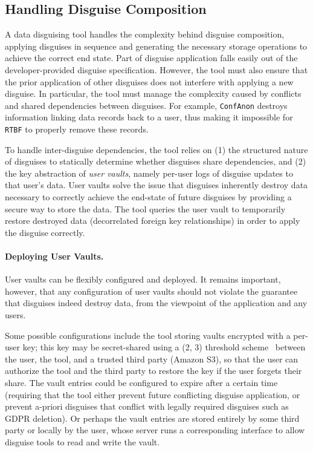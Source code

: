 \subsection{Handling Disguise Composition}
\label{sec:composition}
A data disguising tool handles the complexity behind disguise composition, applying disguises in
sequence and generating the necessary storage operations to achieve the correct end state. 
%
Part of disguise application falls easily out of the developer-provided disguise
specification. However, the tool must also ensure that the prior application of other disguises does
not interfere with applying a new disguise. In particular, the tool must manage the complexity
caused by conflicts and shared dependencies between disguises. 
For example, \texttt{ConfAnon} destroys information linking data records back to a
user, thus making it impossible for \texttt{RTBF} to properly remove these records. 

To handle inter-disguise dependencies, the tool relies on (1) the structured nature of disguises to
statically determine whether disguises share dependencies, and (2) the key abstraction of \emph{user
vaults}, namely per-user logs of disguise updates to that user's data.  User vaults solve the issue
that disguises inherently destroy data necessary to correctly achieve the end-state of future
disguises by providing a secure way to store the data. The tool queries the user vault to
temporarily restore destroyed data (\eg decorrelated foreign key relationships) in order to apply
the disguise correctly.

\paragraph{Deploying User Vaults.}
User vaults can be flexibly configured and deployed. It remains important, however, that any
configuration of user vaults should not violate the guarantee that disguises indeed destroy data,
from the viewpoint of the application and any users. 
%

%
Some possible configurations include the tool storing vaults encrypted with a per-user key; this key
may be secret-shared using a (2, 3) threshold scheme~\cite{secretsharing} between the user, the
tool, and a trusted third party (\eg Amazon S3), so that the user can authorize the tool and the
third party to restore the key if the user forgets their share. 
%
The vault entries could be configured to expire after a certain time (requiring that the tool either
prevent future conflicting disguise application, or prevent a-priori disguises that conflict with
legally required disguises such as GDPR deletion). 
%
Or perhaps the vault entries are stored entirely by some third party or locally by the user, whose
server runs a corresponding interface to allow disguise tools to read and write the vault.

